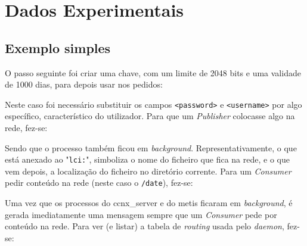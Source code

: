 \documentclass{report}
\begin{document}
\section{Dados Experimentais}

\subsection{Exemplo simples}


O passo seguinte foi criar uma chave, com um limite de 2048 bits e uma validade de 1000 dias, para depois usar nos pedidos:\\


Neste caso foi necessário substituir os campos \texttt{<password>} e \texttt{<username>} por algo específico, característico do utilizador. Para que um \textit{Publisher} colocasse algo na rede, fez-se:\\


Sendo que o processo também ficou em \textit{background}. Representativamente, o que está anexado ao "\texttt{lci:}", simboliza o nome do ficheiro que fica na rede, e o que vem depois, a localização do ficheiro no diretório corrente. Para um \textit{Consumer} pedir conteúdo na rede (neste caso o \texttt{/date}), fez-se:\\


Uma vez que os processos do ccnx\_server e do metis ficaram em \textit{background}, é gerada imediatamente uma mensagem sempre que um \textit{Consumer} pede por conteúdo na rede. Para ver (e listar) a tabela de \textit{routing} usada pelo \textit{daemon}, fez-se:\\
\end{document}
